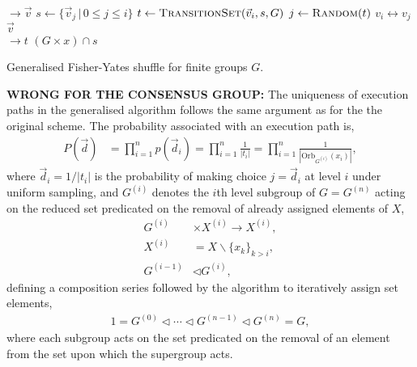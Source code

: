 
\begin{algorithm}[H]
	\begin{algorithmic}
		 $\to \vec{v}$
		 
		\State $s \gets \{\vec{v}_j\,|\, 0\leq j\leq i\}$ 
		\State $t \gets \textsc{TransitionSet}(\vec{v}_i,s,G)$ 
		\State $j \gets \textsc{Random}(t)$ 
		\State $v_i\leftrightarrow v_j$ 
		\EndFor
		\State \Return $\vec{v}$
		\EndFunction
		\\
		 $\to t$ 
		\State \Return $(G\times x) \cap s$ 
		\EndFunction
	\end{algorithmic}
	\caption{Generalised Fisher-Yates shuffle for finite groups $G$.}\label{alg:fisher_yates_general}
\end{algorithm}

\textbf{WRONG FOR THE CONSENSUS GROUP:} The uniqueness of execution paths in the generalised algorithm follows the same argument as for the the original scheme. The probability associated with an execution path is,
\begin{align} \label{eq:group_order_shuffle}
	P(\vec{d}) & = \prod_{i=1}^{n} p(\vec{d}_i) = \prod_{i=1}^{n} \frac{1}{|t_i|} = \prod_{i=1}^{n} \frac{1}{|\mathrm{Orb}_{G^{(i)}}(x_i)|},
\end{align}
where \mbox{$\vec{d}_i=1/|t_i|$} is the probability of making choice \mbox{$j=\vec{d}_i$} at level $i$ under uniform sampling, and $G^{(i)}$ denotes the $i$th level subgroup of $G=G^{(n)}$ acting on the reduced set predicated on the removal of already assigned elements of $X$,
\begin{align} \label{eq:subgroup_struct}
	G^{(i)}   & \times X^{(i)} \to X^{(i)},\nonumber   \\
	X^{(i)}   & = X\backslash\{x_{k}\}_{k>i},\nonumber \\
	G^{(i-1)} & \triangleleft G^{(i)},
\end{align}
defining a composition series followed by the algorithm to iteratively assign set elements,
\begin{align}
	1 = G^{(0)} \triangleleft \cdots \triangleleft G^{(n-1)} \triangleleft G^{(n)} = G,
\end{align}
where each subgroup acts on the set predicated on the removal of an element from the set upon which the supergroup acts.

